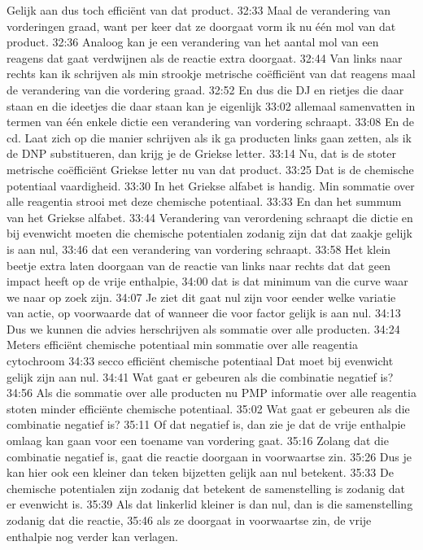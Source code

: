 Gelijk aan dus toch efficiënt van dat product.
32:33
Maal de verandering van vorderingen graad, want per keer dat ze doorgaat vorm ik nu één mol van dat product.
32:36
Analoog kan je een verandering van het aantal mol van een reagens dat gaat verdwijnen als de reactie extra doorgaat.
32:44
Van links naar rechts kan ik schrijven als min strookje metrische coëfficiënt van dat reagens maal de verandering van die vordering graad.
32:52
En dus die DJ en rietjes die daar staan en die ideetjes die daar staan kan je eigenlijk
33:02
allemaal samenvatten in termen van één enkele dictie een verandering van vordering schraapt.
33:08
En de cd. Laat zich op die manier schrijven als ik ga producten links gaan zetten, als ik de DNP substitueren, dan krijg je de Griekse letter.
33:14
Nu, dat is de stoter metrische coëfficiënt Griekse letter nu van dat product.
33:25
Dat is de chemische potentiaal vaardigheid.
33:30
In het Griekse alfabet is handig. Min sommatie over alle reagentia strooi met deze chemische potentiaal.
33:33
En dan het summum van het Griekse alfabet.
33:44
Verandering van verordening schraapt die dictie en bij evenwicht moeten die chemische potentialen zodanig zijn dat dat zaakje gelijk is aan nul,
33:46
dat een verandering van vordering schraapt.
33:58
Het klein beetje extra laten doorgaan van de reactie van links naar rechts dat dat geen impact heeft op de vrije enthalpie,
34:00
dat is dat minimum van die curve waar we naar op zoek zijn.
34:07
Je ziet dit gaat nul zijn voor eender welke variatie van actie, op voorwaarde dat of wanneer die voor factor gelijk is aan nul.
34:13
Dus we kunnen die advies herschrijven als sommatie over alle producten.
34:24
Meters efficiënt chemische potentiaal min sommatie over alle reagentia cytochroom
34:33
secco efficiënt chemische potentiaal Dat moet bij evenwicht gelijk zijn aan nul.
34:41
Wat gaat er gebeuren als die combinatie negatief is?
34:56
Als die sommatie over alle producten nu PMP informatie over alle reagentia stoten minder efficiënte chemische potentiaal.
35:02
Wat gaat er gebeuren als die combinatie negatief is?
35:11
Of dat negatief is, dan zie je dat de vrije enthalpie omlaag kan gaan voor een toename van vordering gaat.
35:16
Zolang dat die combinatie negatief is, gaat die reactie doorgaan in voorwaartse zin.
35:26
Dus je kan hier ook een kleiner dan teken bijzetten gelijk aan nul betekent.
35:33
De chemische potentialen zijn zodanig dat betekent de samenstelling is zodanig dat er evenwicht is.
35:39
Als dat linkerlid kleiner is dan nul, dan is die samenstelling zodanig dat die reactie,
35:46
als ze doorgaat in voorwaartse zin, de vrije enthalpie nog verder kan verlagen.
